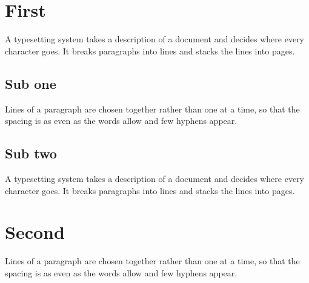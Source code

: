 \documentclass{article}
\begin{document}
\section{First}
A typesetting system takes a description of a document and decides where every character goes. It breaks paragraphs into lines and stacks the lines into pages.

\subsection{Sub one}
Lines of a paragraph are chosen together rather than one at a time, so that the spacing is as even as the words allow and few hyphens appear.

\subsection{Sub two}
A typesetting system takes a description of a document and decides where every character goes. It breaks paragraphs into lines and stacks the lines into pages.

\section{Second}
Lines of a paragraph are chosen together rather than one at a time, so that the spacing is as even as the words allow and few hyphens appear.
\end{document}
